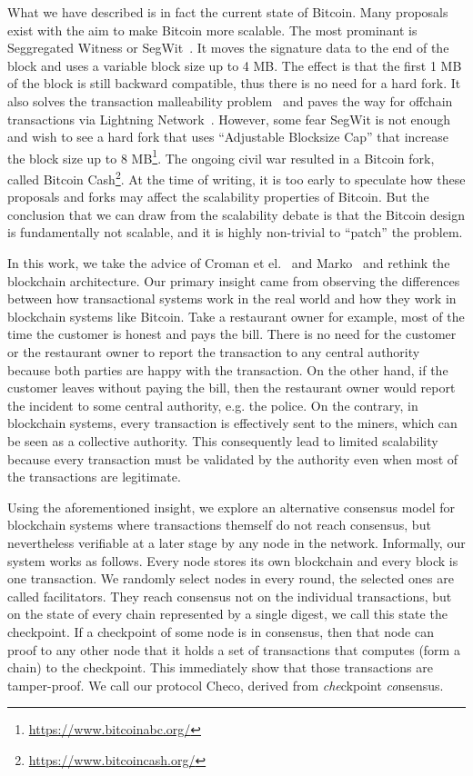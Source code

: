What we have described is in fact the current state of Bitcoin.
Many proposals exist with the aim to make Bitcoin more scalable.
The most prominant is Seggregated Witness or SegWit~\cite{segwit}.
It moves the signature data to the end of the block and uses a variable block size up to 4 MB.
The effect is that the first 1 MB of the block is still backward compatible, thus there is no need for a hard fork.
It also solves the transaction malleability problem~\cite{bitcoinmalleability} and paves the way for offchain transactions via Lightning Network~\cite{lightningnetwork}.
However, some fear SegWit is not enough and wish to see a hard fork that uses ``Adjustable Blocksize Cap'' that increase the block size up to 8 MB\footnote{\url{https://www.bitcoinabc.org/}}.
The ongoing civil war resulted in a Bitcoin fork, called Bitcoin Cash\footnote{\url{https://www.bitcoincash.org/}}.
At the time of writing, it is too early to speculate how these proposals and forks may affect the scalability properties of Bitcoin.
But the conclusion that we can draw from the scalability debate is that the Bitcoin design is fundamentally not scalable,
and it is highly non-trivial to ``patch'' the problem.

In this work, we take the advice of Croman et el.~\cite{croman2016scaling} and Marko~\cite{vukolic2015quest} and rethink the blockchain architecture.
Our primary insight came from observing the differences between how transactional systems work in the real world and how they work in blockchain systems like Bitcoin. 
Take a restaurant owner for example, most of the time the customer is honest and pays the bill.
There is no need for the customer or the restaurant owner to report the transaction to any central authority 
because both parties are happy with the transaction.
On the other hand, if the customer leaves without paying the bill,
then the restaurant owner would report the incident to some central authority, e.g. the police.
On the contrary, in blockchain systems, every transaction is effectively sent to the miners,
which can be seen as a collective authority.
This consequently lead to limited scalability because every transaction must be validated by the authority even when most of the transactions are legitimate.

Using the aforementioned insight,
we explore an alternative consensus model for blockchain systems where transactions themself do not reach consensus,
but nevertheless verifiable at a later stage by any node in the network.
Informally, our system works as follows.
Every node stores its own blockchain and every block is one transaction.
We randomly select nodes in every round, the selected ones are called facilitators.
They reach consensus not on the individual transactions,
but on the state of every chain represented by a single digest, we call this state the checkpoint.
If a checkpoint of some node is in consensus, 
then that node can proof to any other node that it holds a set of transactions that computes (form a chain) to the checkpoint.
This immediately show that those transactions are tamper-proof.
We call our protocol Checo, derived from \emph{che}ckpoint \emph{co}nsensus.

